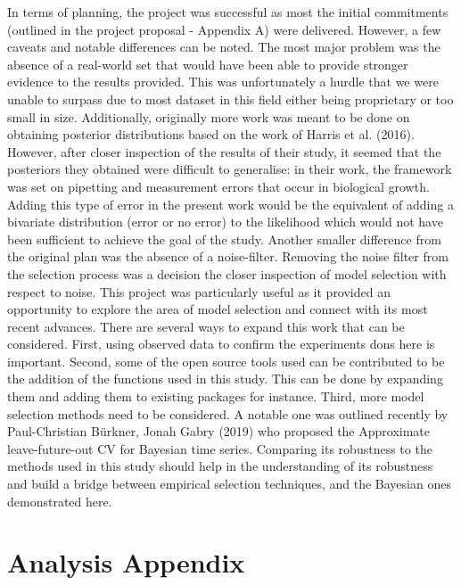 \documentclass[12pt,]{article}
\begin{document}
In terms of planning, the project was successful as most the initial commitments (outlined in the project proposal - Appendix A) were delivered. However, a few caveats and notable differences can be noted. The most major problem was the absence of a real-world set that would have been able to provide stronger evidence to the results provided. This was unfortunately a hurdle that we were unable to surpass due to most dataset in this field either being proprietary or too small in size. Additionally, originally more work was meant to be done on obtaining posterior distributions based on the work of Harris et al. (2016). However, after closer inspection of the results of their study, it seemed that the posteriors they obtained were difficult to generalise: in their work, the framework was set on pipetting and measurement errors that occur in biological growth. Adding this type of error in the present work would be the equivalent of adding a bivariate distribution (error or no error) to the likelihood which would not have been sufficient to achieve the goal of the study. Another smaller difference from the original plan was the absence of a noise-filter. Removing the noise filter from the selection process was a decision the closer inspection of model selection with respect to noise.
This project was particularly useful as it provided an opportunity to explore the area of model selection and connect with its most recent advances. There are several ways to expand this work that can be considered. First, using observed data to confirm the experiments dons here is important. Second, some of the open source tools used can be contributed to be the addition of the functions used in this study. This can be done by expanding them and adding them to existing packages for instance. Third, more model selection methods need to be considered. A notable one was outlined recently by Paul-Christian Bürkner, Jonah Gabry (2019) who proposed the Approximate leave-future-out CV for Bayesian time series. Comparing its robustness to the methods used in this study should help in the understanding of its robustness and build a bridge between empirical selection techniques, and the Bayesian ones demonstrated here.

\newpage

\hypertarget{analysis-appendix}{%
\section{Analysis Appendix}\label{analysis-appendix}}
\end{document}
